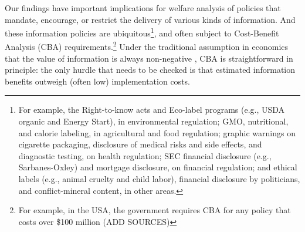 
Our findings have important implications for welfare analysis of policies that mandate, encourage, or restrict the delivery of various kinds of information. And these information  policies are ubiquitous\footnote{For example, the Right-to-know acts and Eco-label programs (e.g., USDA organic and Energy Start), in environmental regulation; GMO, nutritional, and calorie labeling, in agricultural and food regulation; graphic warnings on cigarette packaging, disclosure of medical risks and side effects, and diagnostic testing, on health regulation; SEC financial disclosure (e.g., Sarbanes-Oxley) and mortgage disclosure, on financial regulation; and ethical labels (e.g., animal cruelty and child labor), financial disclosure by politicians, and conflict-mineral content, in other areas.}, and often subject to Cost-Benefit Analysis (CBA) requirements.\footnote{For example, in the USA, the government requires CBA for any policy that costs over \$100 million (ADD SOURCES)} Under the traditional assumption in economics that the value of information is always non-negative \citep{stiglerEconomicsInformation1961}, CBA is straightforward in principle: the only hurdle that needs to be checked is that estimated information benefits outweigh (often low) implementation costs.


